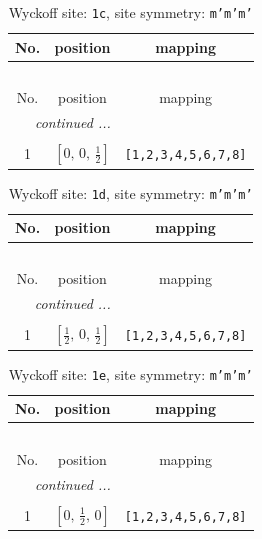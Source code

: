 \documentclass[fleqn,8pt]{jsarticle}
\begin{document}
\begin{longtable}{ccc}
\caption{Wyckoff site: {\tt 1c}, site symmetry: {\tt m'm'm'}}
 \\
 \hline \hline
No. & position & mapping \\ \hline \endfirsthead

\multicolumn{2}{l}{\tablename\ \thetable{}} \\
 \hline \hline
No. & position & mapping \\ \hline \endhead

 \hline \hline
\multicolumn{2}{r}{\footnotesize\it continued ...} \\ \endfoot

 \hline \hline
\multicolumn{2}{r}{} \\ \endlastfoot

1 & $\left[ 0,\, 0,\, \frac{1}{2} \right]$ & {\tt [1,2,3,4,5,6,7,8]} \\
\end{longtable}
\renewcommand{\arraystretch}{1.2}
\begin{longtable}{ccc}
\caption{Wyckoff site: {\tt 1d}, site symmetry: {\tt m'm'm'}}
 \\
 \hline \hline
No. & position & mapping \\ \hline \endfirsthead

\multicolumn{2}{l}{\tablename\ \thetable{}} \\
 \hline \hline
No. & position & mapping \\ \hline \endhead

 \hline \hline
\multicolumn{2}{r}{\footnotesize\it continued ...} \\ \endfoot

 \hline \hline
\multicolumn{2}{r}{} \\ \endlastfoot

1 & $\left[ \frac{1}{2},\, 0,\, \frac{1}{2} \right]$ & {\tt [1,2,3,4,5,6,7,8]} \\
\end{longtable}
\renewcommand{\arraystretch}{1.2}
\begin{longtable}{ccc}
\caption{Wyckoff site: {\tt 1e}, site symmetry: {\tt m'm'm'}}
 \\
 \hline \hline
No. & position & mapping \\ \hline \endfirsthead

\multicolumn{2}{l}{\tablename\ \thetable{}} \\
 \hline \hline
No. & position & mapping \\ \hline \endhead

 \hline \hline
\multicolumn{2}{r}{\footnotesize\it continued ...} \\ \endfoot

 \hline \hline
\multicolumn{2}{r}{} \\ \endlastfoot

1 & $\left[ 0,\, \frac{1}{2},\, 0 \right]$ & {\tt [1,2,3,4,5,6,7,8]} \\
\end{longtable}
\end{document}
